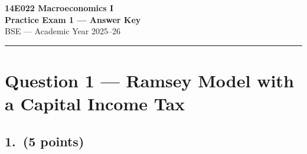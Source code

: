 \documentclass[a4paper,11pt]{article}
\begin{document}

\begin{center}
    {\LARGE \textbf{14E022 Macroeconomics I}}\\[6pt]
    {\Large \textbf{Practice Exam 1 --- Answer Key}}\\[8pt]
    {\large BSE --- Academic Year 2025--26}
\end{center}

\noindent\rule{\textwidth}{0.4pt}

\section{Question 1 --- Ramsey Model with a Capital Income Tax}

\subsection*{1.\ (5 points)}
\end{document}
